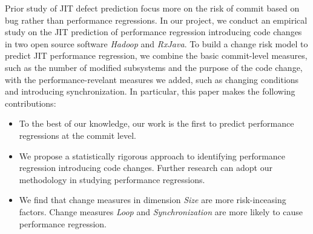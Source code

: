 Prior study of JIT defect prediction focus more on the risk of commit based on bug rather than performance regressions. In our project, we conduct an empirical study on the JIT prediction of performance regression introducing code changes  in two open source software \emph{Hadoop} and \emph{RxJava}. To build a change risk model to predict JIT performance regression, we combine the basic commit-level measures, such as the number of modified subsystems and the purpose of the code change, with the performance-revelant measures we added, such as changing conditions and introducing synchronization. In particular, this paper makes the following contributions:
\vspace{-0.2cm}
\begin{itemize} \itemsep 0em
\item To the best of our knowledge, our work is the first to predict performance regressions at the commit level. 
\item We propose a statistically rigorous approach to identifying performance regression introducing code changes. Further research can adopt our methodology in studying performance regressions.
\item We find that change measures in dimension \emph{Size} are more risk-inceasing factors. Change measures \emph{Loop} and \emph{Synchronization} are more likely to cause performance regression.
\end{itemize}
